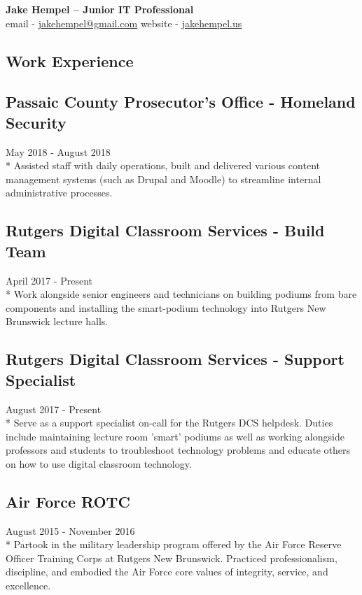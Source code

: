 \documentclass{article}
\begin{document}
\begin{center}
\huge{\textbf{Jake Hempel -- Junior IT Professional}} \\
\large{email - \href{mailto:jakehempel@gmail.com}{jakehempel@gmail.com}
website - \href{jakehempel.us}{jakehempel.us}}
\end{center}

\begin{multicols}{2}

\section{Work Experience}

\subsection{Passaic County Prosecutor's Office - Homeland Security}
May 2018 - August 2018\\*
Assisted staff with daily operations, built and delivered various content management systems (such as  Drupal and Moodle) to streamline internal administrative processes. 

\subsection{Rutgers Digital Classroom Services - Build Team}
April 2017 - Present\\*
Work alongside senior engineers and technicians on building podiums from bare components and installing the smart-podium technology into Rutgers New Brunswick lecture halls.

\subsection{Rutgers Digital Classroom Services - Support Specialist}
August 2017 - Present\\*
Serve as a support specialist on-call for the Rutgers DCS helpdesk. Duties include maintaining lecture room 'smart' podiums as well as working alongside professors and students to troubleshoot technology problems and educate others on how to use digital classroom technology.

\subsection{Air Force ROTC}
August 2015 - November 2016\\*
Partook in the military leadership program offered by the Air Force Reserve Officer Training Corps at Rutgers New Brunswick. Practiced professionalism, discipline, and embodied the Air Force core values of integrity, service, and excellence.


\end{multicols}
\end{document}
